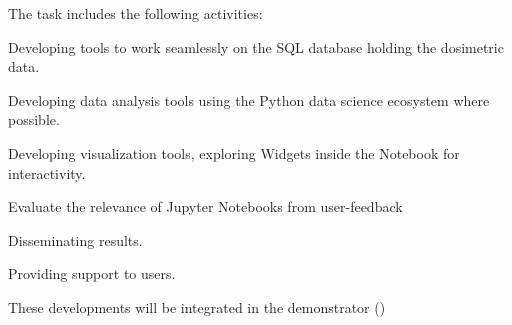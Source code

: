 \begin{task}[
  title=Nuclear Medicine application,
  id=opendose-analysis,
  lead=INSERM,
  PM=24,
  wphases={3-33},
  partners={XFEL}
]
  The task includes the following activities:
  \begin{compactitem}
  \item Developing tools to work seamlessly on the SQL database holding the
    dosimetric data.
  \item Developing data analysis tools using the Python data science ecosystem
    where possible.
  \item Developing visualization tools, exploring Widgets inside the Notebook
    for interactivity.
  \item Evaluate the relevance of Jupyter Notebooks from user-feedback
  \item Disseminating results.
  \item Providing support to users.
  \end{compactitem}
  These developments will be integrated in the demonstrator
  ()





\end{task}
